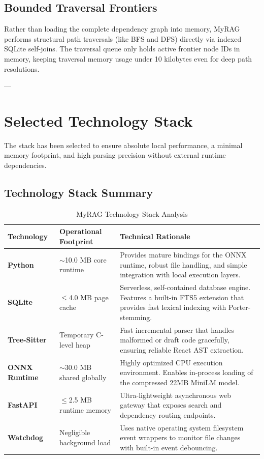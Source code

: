\documentclass[11pt,a4paper]{article}
\begin{document}
\subsection{Bounded Traversal Frontiers}
Rather than loading the complete dependency graph into memory, MyRAG performs structural path traversals (like BFS and DFS) directly via indexed SQLite self-joins. The traversal queue only holds active frontier node IDs in memory, keeping traversal memory usage under 10 kilobytes even for deep path resolutions.

---

\section{Selected Technology Stack}
The stack has been selected to ensure absolute local performance, a minimal memory footprint, and high parsing precision without external runtime dependencies.

\subsection{Technology Stack Summary}
\begin{table}[h!]
\centering
\begin{tabular}{llp{7.5cm}}
\toprule
\bfseries Technology & \bfseries Operational Footprint & \bfseries Technical Rationale \\
\midrule
\rowcolor{lightbg}
\textbf{Python} & $\sim$10.0 MB core runtime & Provides mature bindings for the ONNX runtime, robust file handling, and simple integration with local execution layers. \\
\textbf{SQLite} & $\le$4.0 MB page cache & Serverless, self-contained database engine. Features a built-in FTS5 extension that provides fast lexical indexing with Porter-stemming. \\
\rowcolor{lightbg}
\textbf{Tree-Sitter} & Temporary C-level heap & Fast incremental parser that handles malformed or draft code gracefully, ensuring reliable React AST extraction. \\
\textbf{ONNX Runtime} & $\sim$30.0 MB shared globally & Highly optimized CPU execution environment. Enables in-process loading of the compressed 22MB MiniLM model. \\
\rowcolor{lightbg}
\textbf{FastAPI} & $\le$2.5 MB runtime memory & Ultra-lightweight asynchronous web gateway that exposes search and dependency routing endpoints. \\
\textbf{Watchdog} & Negligible background load & Uses native operating system filesystem event wrappers to monitor file changes with built-in event debouncing. \\
\bottomrule
\end{tabular}
\caption{MyRAG Technology Stack Analysis}
\end{table}
\end{document}
